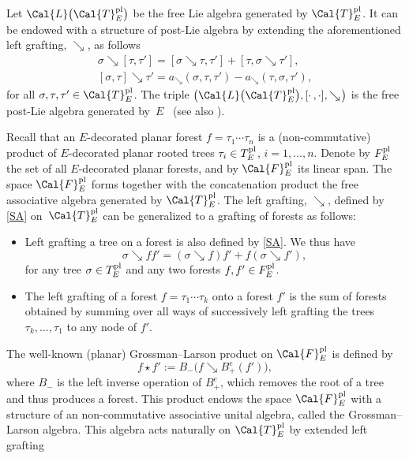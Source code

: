 \documentclass[pdftex]{sigma}
\numberwithin{equation}{section}
\begin{document}
Let $\Cal{L}\big(\Cal{T}^{\rm pl}_{E}\big)$ be the free Lie algebra generated by $\Cal{T}^{\rm pl}_{E}$. It can be endowed with a structure of post-Lie algebra by extending the aforementioned left grafting, $\searrow$, as follows
\begin{gather*}
\sigma \searrow [ \tau, \tau']
 = [ \sigma \searrow \tau, \tau'] + [ \tau, \sigma \searrow \tau'],
\\
[\sigma,\tau] \searrow \tau'
 = a_{\searrow}(\sigma, \tau, \tau') - a_{\searrow}(\tau, \sigma, \tau'),
\end{gather*}
for all $\sigma, \tau, \tau' \in \Cal{T}^{\rm pl}_E$. The triple $\big(\Cal{L}\big(\Cal{T}^{\rm pl}_E\big), [\cdot\,,\cdot ], \searrow\!\big)$ is the free post-Lie algebra generated by~$E$~\cite{BV2007} (see also \cite{HA13,MKW08}).

Recall that an $E$-decorated planar forest $f=\tau_1 \cdots \tau_n$ is a (non-commutative) product of $E$-decorated planar rooted trees $\tau_i\in T_E^{\rm pl}$, $i=1,\ldots ,n$. Denote by $F^{\rm pl}_{E}$ the set of all $E$-decorated planar forests, and by $\Cal{F}^{\rm pl}_{E}$ its linear span. The space $\Cal{F}^{\rm pl}_{E}$ forms together with the concatenation product the free associative algebra generated by $\Cal{T}^{\rm pl}_{E}$. The left grafting, $\searrow$, defined by \eqref{SA} on~$\Cal{T}^{\rm pl}_{E}$ can be generalized to a grafting of forests as follows:
\begin{itemize}\itemsep=0pt
\item Left grafting a tree on a forest is also defined by \eqref{SA}. We thus have
\begin{displaymath}
\sigma\searrow{ff'}=(\sigma\searrow f)f'+f(\sigma\searrow f'),
\end{displaymath}
for any tree $\sigma\in T_E^{\rm pl}$ and any two forests $f,f'\in F_E^{\rm pl}$.

\item The left grafting of a forest $f =\tau_1\cdots\tau_k$ onto a forest $f'$ is the sum of forests obtained by summing over all ways of successively left grafting the trees $\tau_k,\ldots,\tau_1$ to any node of $f'$.
\end{itemize}
The well-known (planar) Grossman--Larson product on $\Cal{F}^{\rm pl}_{E}$ is defined by \cite{GL1989}
\begin{equation}
\label{glf}
f \star f' := B_{-}\big(f \searrow B^e_{+}(f')\big),
\end{equation}
where $B_{-}$ is the left inverse operation of $B^e_{+}$, which removes the root of a tree and thus produces a forest. This product endows the space $\Cal{F}^{\rm pl}_{E}$ with a structure of an non-commutative associative unital algebra, called the Grossman--Larson algebra. This algebra acts naturally on $\Cal{T}^{\rm pl}_{E}$ by extended left grafting
\end{document}
